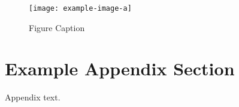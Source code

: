 \documentclass[authoryear,preprint,12pt,3p]{elsarticle}
\begin{document}
\begin{figure}[t]%
\centering%
\texttt{[image: example-image-a]}
\caption{Figure Caption}\label{fig1}
\end{figure}


\appendix
\section{Example Appendix Section}
\label{app1}

Appendix text.












\end{document}

